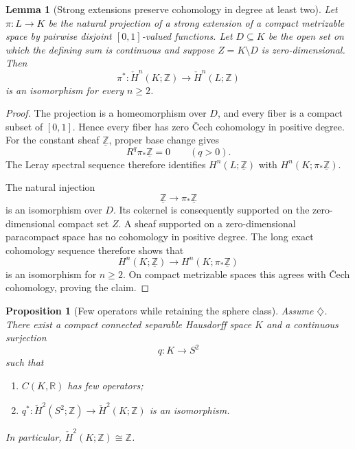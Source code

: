 \documentclass[11pt]{article}
\newtheorem{proposition}[theorem]{Proposition}
\newtheorem{lemma}[theorem]{Lemma}
\theoremstyle{definition}
\theoremstyle{remark}
\newcommand{\R}{\mathbb R}
\newcommand{\Z}{\mathbb Z}
\newcommand{\Hcheck}{\check H}
\begin{document}
\begin{lemma}[Strong extensions preserve cohomology in degree at least two]\label{lem:cohomology-strong-extension}
Let $\pi:L\to K$ be the natural projection of a strong extension of a compact metrizable space by pairwise disjoint $[0,1]$-valued functions. Let $D\subseteq K$ be the open set on which the defining sum is continuous and suppose $Z=K\setminus D$ is zero-dimensional. Then
\[
       \pi^*:\Hcheck^n(K;\Z)\longrightarrow\Hcheck^n(L;\Z)
\]
is an isomorphism for every $n\ge2$.
\end{lemma}

\begin{proof}
The projection is a homeomorphism over $D$, and every fiber is a compact subset of $[0,1]$. Hence every fiber has zero \v Cech cohomology in positive degree. For the constant sheaf $\underline{\Z}$, proper base change \cite{Bredon,Iversen} gives
\[
       R^q\pi_*\underline{\Z}=0\qquad(q>0).
\]
The Leray spectral sequence therefore identifies $H^n(L;\underline{\Z})$ with $H^n(K;\pi_*\underline{\Z})$.

The natural injection
\[
       \underline{\Z}\longrightarrow\pi_*\underline{\Z}
\]
is an isomorphism over $D$. Its cokernel is consequently supported on the zero-dimensional compact set $Z$. A sheaf supported on a zero-dimensional paracompact space has no cohomology in positive degree. The long exact cohomology sequence therefore shows that
\[
       H^n(K;\underline{\Z})\longrightarrow H^n(K;\pi_*\underline{\Z})
\]
is an isomorphism for $n\ge2$. On compact metrizable spaces this agrees with \v Cech cohomology, proving the claim.
\end{proof}

\begin{proposition}[Few operators while retaining the sphere class]\label{prop:diamond-K}
Assume $\diamondsuit$. There exist a compact connected separable Hausdorff space $K$ and a continuous surjection
\[
       q:K\longrightarrow S^2
\]
such that
\begin{enumerate}[label=(\roman*)]
\item $C(K,\R)$ has few operators;
\item $q^*:\Hcheck^2(S^2;\Z)\to\Hcheck^2(K;\Z)$ is an isomorphism.
\end{enumerate}
In particular, $\Hcheck^2(K;\Z)\cong\Z$.
\end{proposition}
\end{document}
